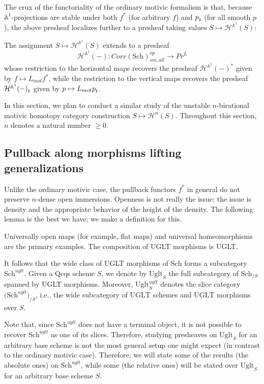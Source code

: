 The crux of the functoriality of the ordinary motivic formalism is that, because $\mathbb{A}^1$-projections are stable under both $f^*$ (for arbitrary $f$) and $p_{\mathord{\text{\tiny $\sharp$}}}$ (for all smooth $p$), the above presheaf localizes further to a presheaf taking values $S\mapsto \mathcal{H}^{\mathbb{A}^1}(S)$:
\begin{prop}
 The assignment $S\mapsto \mathcal{H}^{\mathbb{A}^1}(S)$ extends to a presheaf $$\mathcal{H}^{\mathbb{A}^1}(-):Corr(\mathrm{Sch})_{sm,all}^{op}\to Pr^L$$ whose restriction to the horizontal maps recovers the presheaf $\mathcal{H}^{\mathbb{A}^1}(-)^*$ given by $f\mapsto L_{mot}f^*$, while the restriction to the vertical maps recovers the presheaf $\mathcal{H}^{\mathbb{A}^1}(-)_{\mathord{\text{\tiny $\sharp$}}}$ given by $p\mapsto L_{mot}p_{\mathord{\text{\tiny $\sharp$}}}$.
\end{prop}
In this section, we plan to conduct a similar study of the unstable $n$-birational motivic homotopy category construction $S\mapsto \mathcal{H}^n(S)$. Throughout this section, $n$ denotes a natural number $\geq 0$.
\subsection{Pullback along morphisms lifting generalizations}


Unlike the ordinary motivic case, the pullback functors $f^*$ in general do not preserve $n$-dense open immersions. Openness is not really the issue; the issue is density and the appropriate behavior of the height of the density. The following lemma is the best we have; we make a definition for this.
\begin{ex}
Universally open maps (for example, flat maps) and universal homeomorphisms are the primary examples. The composition of UGLT morphisms is UGLT.
\end{ex}
It follows that the wide class of UGLT morphisms of $\mathrm{Sch}$ forms a subcategory $\mathrm{Sch}^{uglt}$. Given a Qcqs scheme $S$, we denote by $\mathrm{Uglt}_S$ the full subcategory of $\mathrm{Sch}_{/S}$ spanned by UGLT morphisms. Moreover, $\mathrm{Uglt}^{uglt}_S$ denotes the slice category $({\mathrm{Sch}^{uglt})}_{/S}$, i.e., the wide subcategory of $\mathrm{UGLT}$ schemes and $\mathrm{UGLT}$ morphisms over $S$. 

Note that, since $\mathrm{Sch}^{uglt}$ does not have a terminal object, it is not possible to recover $\mathrm{Sch}^{uglt}$ as one of its slices. Therefore, studying presheaves on $\mathrm{Uglt}_{S}$ for an arbitrary base scheme is not the most general setup one might expect (in contrast to the ordinary motivic case). Therefore, we will state some of the results (the absolute ones) on $\mathrm{Sch}^{uglt}$, while some (the relative ones) will be stated over $\mathrm{Uglt}_S$ for an arbitrary base scheme $S$.

